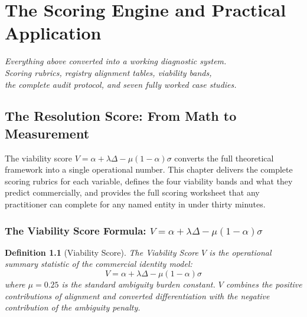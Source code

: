 \documentclass[12pt, openany]{book}
\theoremstyle{thmstyle}
\theoremstyle{defstyle}
\newtheorem{definition}{Definition}[chapter]
\begin{document}
\tableofcontents
\newpage

\part{The Scoring Engine and Practical Application}

\vspace{16pt}
\begin{center}
\color{accentgray}\itshape
Everything above converted into a working diagnostic system.\\
Scoring rubrics, registry alignment tables, viability bands,\\
the complete audit protocol, and seven fully worked case studies.
\end{center}

\chapter{The Resolution Score: From Math to Measurement}

\begin{keybox}
The viability score $V = \alpha + \lambda\Delta - \mu(1-\alpha)\sigma$ converts the full theoretical framework into a single operational number. This chapter delivers the complete scoring rubrics for each variable, defines the four viability bands and what they predict commercially, and provides the full scoring worksheet that any practitioner can complete for any named entity in under thirty minutes.
\end{keybox}

\section{The Viability Score Formula: $V = \alpha + \lambda\Delta - \mu(1-\alpha)\sigma$}

\begin{definition}[Viability Score]
The Viability Score $V$ is the operational summary statistic of the commercial identity model:
\begin{equation}
V = \alpha + \lambda\Delta - \mu(1-\alpha)\sigma
\label{eq:viability}
\end{equation}
where $\mu = 0.25$ is the standard ambiguity burden constant. $V$ combines the positive contributions of alignment and converted differentiation with the negative contribution of the ambiguity penalty.
\end{definition}
\end{document}
